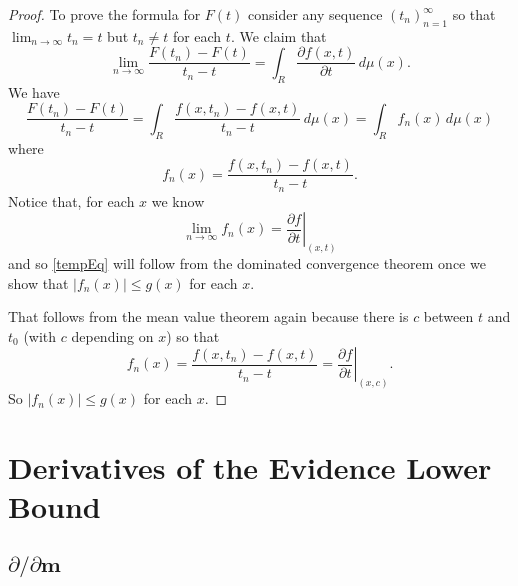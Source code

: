 \documentclass{article}
\theoremstyle{definition}
\begin{document}
\begin{proof}
  To prove the formula for $F(t)$ consider any sequence $(t_n)_{n=1}^\infty$ so
  that $\lim_{n \to \infty} t_n = t$ but $t_n \neq t$ for each $t$. We claim
  that
  \begin{equation} \label{tempEq}
    \lim_{n \to \infty} \frac{F(t_n) - F(t)}{t_n - t} = \int_R
    \frac{\partial f(x, t)}{\partial t}\,d\mu(x).
  \end{equation}
  We have
  \[ \frac{F(t_n) - F(t)}{t_n - t} = \int_R \frac{f(x, t_n) - f(x, t)}{t_n -
      t}\,d\mu(x) = \int_R f_n(x)\,d\mu(x) \]
  where
  \[ f_n(x) = \frac{f(x, t_n) - f(x, t)}{t_n - t}. \]
  Notice that, for each $x$ we know
  \[ \lim_{n \to \infty} f_n(x) = \left.\frac{\partial f}{\partial
        t}\right|_{(x, t)} \]
  and so \eqref{tempEq} will follow from the dominated convergence theorem once we show
  that $|f_n(x)| \le g(x)$ for each $x$.

  That follows from the mean value theorem again because there is $c$ between $t$
  and $t_0$ (with $c$ depending on $x$) so that
  \[ f_n(x) = \frac{f(x, t_n) - f(x, t)}{t_n - t} = \left.\frac{\partial
        f}{\partial t}\right|_{(x, c)}. \]
  So $|f_n(x)| \le g(x)$ for each $x$.
\end{proof}

\section{Derivatives of the Evidence Lower Bound}

\subsection{$\partial/\partial\mathbf{m}$}
\end{document}
